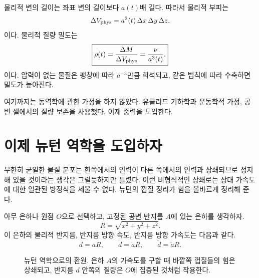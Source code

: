물리적 변의 길이는 좌표 변의 길이보다 \(a(t)\)배 길다. 따라서 물리적 부피는 \begin{equation}
\Delta V_{\rm phys}=a^3(t)\,\Delta x\,\Delta y\,\Delta z.
\end{equation}이다. 물리적 질량 밀도는 \begin{equation}
\boxed{\rho(t)=\frac{\Delta M}{\Delta V_{\rm phys}}=\frac{\nu}{a^3(t)}.}
\label{eq:c01-density-dilution}
\end{equation}이다. 압력이 없는 물질은 팽창에 따라 \(a^{-3}\)만큼 희석되고, 같은 법칙에 따라 수축하면 밀도가 높아진다.

여기까지는 동역학에 관한 가정을 하지 않았다. 유클리드 기하학과 운동학적 가정, 공변 셀에서의 질량 보존을 사용했다. 이제 중력을 도입한다.

\section{이제 뉴턴 역학을 도입하자}

무한히 균일한 물질 분포는 한쪽에서의 인력이 다른 쪽에서의 인력과 상쇄되므로 정지해 있을 것이라는 생각은 그럴듯하지만 틀렸다. 이런 비형식적인 상쇄로는 상대 가속도에 대한 일관된 방정식을 세울 수 없다. 뉴턴의 껍질 정리가 힘을 올바르게 정리해 준다.

아무 은하나 원점 \(O\)으로 선택하고, 고정된 공변 반지름 \(A\)에 있는 은하를 생각하자. \begin{equation}
R=\sqrt{x^2+y^2+z^2}.
\end{equation}이 은하의 물리적 반지름, 반지름 방향 속도, 반지름 방향 가속도는 다음과 같다. \begin{equation}
d=aR,
\qquad
\dot d=\dot a R,
\qquad
\ddot d=\ddot a R.
\label{eq:c01-radial-kinematics}
\end{equation}

\begin{figure}[ht]\centering
{}\caption{뉴턴 역학으로의 환원. 은하 \(A\)의 가속도를 구할 때 바깥쪽 껍질들의 힘은 상쇄되고, 반지름 \(d\) 안쪽의 질량은 \(O\)에 집중된 것처럼 작용한다.}\label{fig:c01-newton-sphere}\end{figure}

